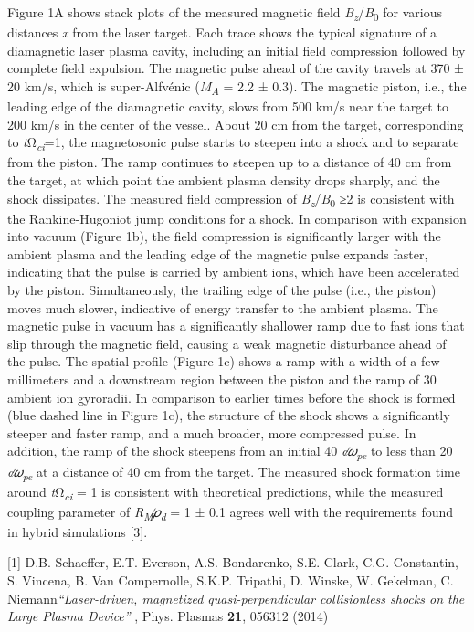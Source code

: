 \documentclass[11pt]{article}
\begin{document}
\begin{description}
Figure 1A shows stack plots of the measured magnetic field
\emph{B\textsubscript{z}}/\emph{B}\textsubscript{0} for various
distances \emph{x} from the laser target. Each trace shows the typical
signature of a diamagnetic laser plasma cavity, including an initial
field compression followed by complete field expulsion. The magnetic
pulse ahead of the cavity travels at 370 ± 20 km/s, which is
super-Alfvénic (\emph{M\textsubscript{A}} = 2.2 ± 0.3). The magnetic
piston, i.e., the leading edge of the diamagnetic cavity, slows from 500
km/s near the target to 200 km/s in the center of the vessel. About 20
cm from the target, corresponding to
\emph{t}Ω\emph{\textsubscript{ci}}=1, the magnetosonic pulse starts to
steepen into a shock and to separate from the piston. The ramp continues
to steepen up to a distance of 40 cm from the target, at which point the
ambient plasma density drops sharply, and the shock dissipates. The
measured field compression of
\emph{B\textsubscript{z}}/\emph{B}\textsubscript{0} ≥2 is consistent
with the Rankine-Hugoniot jump conditions for a shock. In comparison
with expansion into vacuum (Figure 1b), the field compression is
significantly larger with the ambient plasma and the leading edge of the
magnetic pulse expands faster, indicating that the pulse is carried by
ambient ions, which have been accelerated by the piston. Simultaneously,
the trailing edge of the pulse (i.e., the piston) moves much slower,
indicative of energy transfer to the ambient plasma. The magnetic pulse
in vacuum has a significantly shallower ramp due to fast ions that slip
through the magnetic field, causing a weak magnetic disturbance ahead of
the pulse. The spatial profile (Figure 1c) shows a ramp with a width of
a few millimeters and a downstream region between the piston and the
ramp of 30 ambient ion gyroradii. In comparison to earlier times before
the shock is formed (blue dashed line in Figure 1c), the structure of
the shock shows a significantly steeper and faster ramp, and a much
broader, more compressed pulse. In addition, the ramp of the shock
steepens from an initial 40 \emph{c}∕\emph{𝜔\textsubscript{pe}} to less
than 20 \emph{c}∕\emph{𝜔\textsubscript{pe}} at a distance of 40 cm from
the target. The measured shock formation time around
\emph{t}Ω\emph{\textsubscript{ci}} = 1 is consistent with theoretical
predictions, while the measured coupling parameter of
\emph{R\textsubscript{M}}∕\emph{𝜌\textsubscript{d}} = 1 ± 0.1 agrees
well with the requirements found in hybrid simulations {[}3{]}.

{[}1{]} D.B. Schaeffer, E.T. Everson, A.S. Bondarenko, S.E. Clark, C.G.
Constantin, S. Vincena, B. Van Compernolle, S.K.P. Tripathi, D. Winske,
W. Gekelman, C. Niemann\emph{``Laser-driven, magnetized
quasi-perpendicular collisionless shocks on the Large Plasma Device''} ,
Phys. Plasmas \textbf{21}, 056312 (2014)


\end{description}
\end{document}
